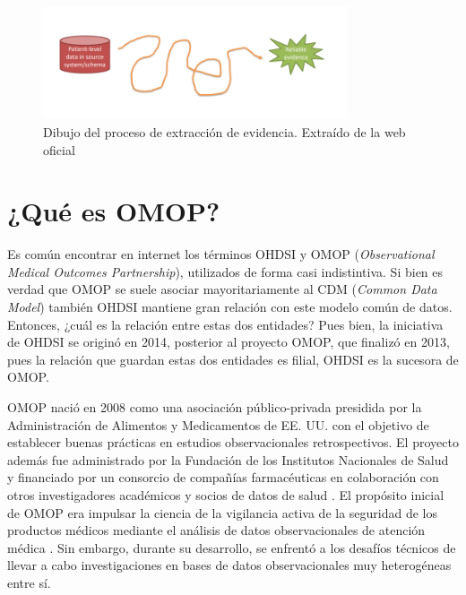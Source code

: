 \begin{enumerate}[label=\roman*.]
\begin{figure}[H]
    \centering
    \includegraphics[width=0.80\textwidth]{figures/drawinJourney.png}
     \caption{Dibujo del proceso de extracción de evidencia. Extraído de la web oficial \cite{OHDSIwebsite}}
    \label{fig:drawinJourney}
\end{figure}



\end{enumerate}


\section{¿Qué es OMOP?} \label{sec:05omop}

Es común encontrar en internet los términos OHDSI y OMOP (\textit{Observational Medical Outcomes Partnership}), utilizados de forma casi indistintiva. Si bien es verdad que OMOP se suele asociar mayoritariamente al CDM (\textit{Common Data Model}) también OHDSI mantiene gran relación con este modelo común de datos. Entonces, ¿cuál es la relación entre estas dos entidades? Pues bien, la iniciativa de OHDSI se originó en 2014, posterior al proyecto OMOP, que finalizó en 2013, pues la relación que guardan estas dos entidades es filial, OHDSI es la sucesora de OMOP. 

OMOP nació en 2008 como una asociación público-privada presidida por la Administración de Alimentos y Medicamentos de EE. UU. con el objetivo de establecer buenas prácticas en estudios observacionales retrospectivos. El proyecto además fue administrado por la Fundación de los Institutos Nacionales de Salud y financiado por un consorcio de compañías farmacéuticas en colaboración con otros investigadores académicos y socios de datos de salud \cite{stang2010advancing}. El propósito inicial de OMOP era impulsar la ciencia de la vigilancia activa de la seguridad de los productos médicos mediante el análisis de datos observacionales de atención médica \cite{stang2010advancing}. Sin embargo, durante su desarrollo, se enfrentó a los desafíos técnicos de llevar a cabo investigaciones en bases de datos observacionales muy heterogéneas entre sí.

